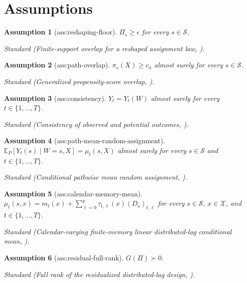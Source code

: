 \documentclass{article}
\newtheorem{assumption}{Assumption}
\begin{document}
\section{Assumptions}

\begin{assumption}[ass:reshaping-floor]\label{ass:reshaping-floor}
\(\Pi_s\ge\epsilon\) for every \(s\in\mathcal S\).
\par\smallskip\noindent\emph{Standard} (Finite-support overlap for a reshaped assignment law, \cite{ArkhangelskyImbensLeiLuo2024}).
\end{assumption}

\begin{assumption}[ass:path-overlap]\label{ass:path-overlap}
\(\pi_s(X)\ge c_{\pi}\) almost surely for every \(s\in\mathcal S\).
\par\smallskip\noindent\emph{Standard} (Generalized propensity-score overlap, \cite{ArkhangelskyImbensLeiLuo2024}).
\end{assumption}

\begin{assumption}[ass:consistency]\label{ass:consistency}
\(Y_t=Y_t(W)\) almost surely for every \(t\in\{1,\ldots,T\}\).
\par\smallskip\noindent\emph{Standard} (Consistency of observed and potential outcomes, \cite{BojinovRambachanShephard2021}).
\end{assumption}

\begin{assumption}[ass:path-mean-random-assignment]\label{ass:path-mean-random-assignment}
\(\mathbb E_P[Y_t(s)\mid W=s,X]=\mu_t(s,X)\) almost surely for every \(s\in\mathcal S\) and \(t\in\{1,\ldots,T\}\).
\par\smallskip\noindent\emph{Standard} (Conditional pathwise mean random assignment, \cite{ArkhangelskyImbensLeiLuo2024}).
\end{assumption}

\begin{assumption}[ass:calendar-memory-mean]\label{ass:calendar-memory-mean}
\(\mu_t(s,x)=m_t(x)+\sum_{\ell=0}^{p}\tau_{t,\ell}(x)(D_s)_{t,\ell}\) for every \(s\in\mathcal S\), \(x\in\mathcal X\), and \(t\in\{1,\ldots,T\}\).
\par\smallskip\noindent\emph{Standard} (Calendar-varying finite-memory linear distributed-lag conditional mean, \cite{AiligengLuWang2023}).
\end{assumption}

\begin{assumption}[ass:residual-full-rank]\label{ass:residual-full-rank}
\(G(\Pi)\succ0\).
\par\smallskip\noindent\emph{Standard} (Full rank of the residualized distributed-lag design, \cite{ArkhangelskyImbensLeiLuo2024}).
\end{assumption}
\end{document}
